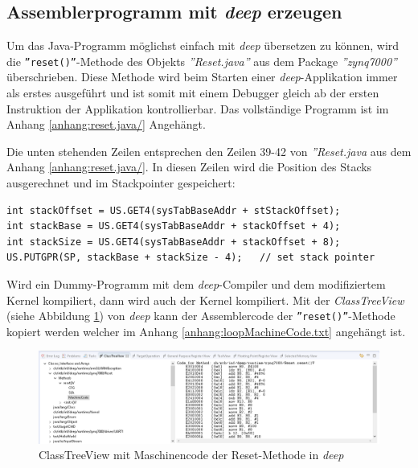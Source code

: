 \subsection{Assemblerprogramm mit \textit{deep} erzeugen}
Um das Java-Programm möglichst einfach mit \textit{deep} übersetzen zu können, wird die \texttt{''reset()''}-Methode des Objekts \textit{''Reset.java''} aus dem Package \textit{''zynq7000''} überschrieben.
Diese Methode wird beim Starten einer \textit{deep}-Applikation immer als erstes ausgeführt und ist somit mit einem Debugger gleich ab der ersten Instruktion der Applikation kontrollierbar.
Das vollständige Programm ist im Anhang \ref{anhang:reset.java/} Angehängt.

Die unten stehenden Zeilen entsprechen den Zeilen 39-42 von \textit{''Reset.java} aus dem Anhang \ref{anhang:reset.java/}.
In diesen Zeilen wird die Position des Stacks ausgerechnet und im Stackpointer gespeichert:
\lstset{language=java}
\begin{lstlisting}
int stackOffset = US.GET4(sysTabBaseAddr + stStackOffset);
int stackBase = US.GET4(sysTabBaseAddr + stackOffset + 4);
int stackSize = US.GET4(sysTabBaseAddr + stackOffset + 8);
US.PUTGPR(SP, stackBase + stackSize - 4);	// set stack pointer
\end{lstlisting}

Wird ein Dummy-Programm mit dem \textit{deep}-Compiler und dem modifiziertem Kernel kompiliert, dann wird auch der Kernel kompiliert.
Mit der \textit{ClassTreeView} (siehe Abbildung \ref{fig:MaschineCode.ClassTreeView.Deep}) von \textit{deep} kann der Assemblercode der \texttt{''reset()''}-Methode kopiert werden welcher im Anhang \ref{anhang:loopMachineCode.txt} angehängt ist.

\begin{figure}[htbp]
	\centering
		\includegraphics[width=\textwidth,height=\textheight,keepaspectratio]{images/MaschineCode_ClassTreeView_Deep.PNG}
	\caption[]{ClassTreeView mit Maschinencode der Reset-Methode in \textit{deep}}
	\label{fig:MaschineCode.ClassTreeView.Deep}
\end{figure}


